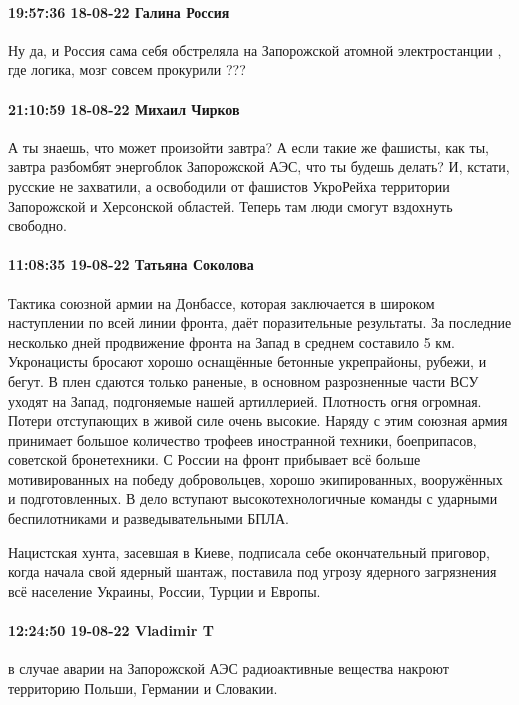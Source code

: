 \paragraph{19:57:36 18-08-22 Галина Россия}

Ну да, и Россия сама себя обстреляла на Запорожской атомной электростанции ,
где логика, мозг совсем прокурили ???

\paragraph{21:10:59 18-08-22 Михаил Чирков}

А ты знаешь, что может произойти завтра?
А если такие же фашисты, как ты, завтра разбомбят энергоблок Запорожской АЭС, что ты будешь делать?
И, кстати, русские не захватили, а освободили от фашистов УкроРейха территории Запорожской и Херсонской областей.
Теперь там люди смогут вздохнуть свободно.

\paragraph{11:08:35 19-08-22 Татьяна Соколова}

Тактика союзной армии на Донбассе, которая заключается в широком наступлении по
всей линии фронта, даёт поразительные результаты. За последние несколько дней
продвижение фронта на Запад в среднем составило 5 км. Укронацисты бросают
хорошо оснащённые бетонные укрепрайоны, рубежи, и бегут. В плен сдаются только
раненые, в основном разрозненные части ВСУ уходят на Запад, подгоняемые нашей
артиллерией. Плотность огня огромная. Потери отступающих в живой силе очень
высокие. Наряду с этим союзная армия принимает большое количество трофеев
иностранной техники, боеприпасов, советской бронетехники. С России на фронт
прибывает всё больше мотивированных на победу добровольцев, хорошо
экипированных, вооружённых и подготовленных. В дело вступают
высокотехнологичные команды с ударными беспилотниками и разведывательными БПЛА.

Нацистская хунта, засевшая в Киеве, подписала себе окончательный приговор,
когда начала свой ядерный шантаж, поставила под угрозу ядерного загрязнения всё
население Украины, России, Турции и Европы.

\paragraph{12:24:50 19-08-22 Vladimir T}

в случае аварии на Запорожской АЭС радиоактивные вещества накроют территорию
Польши, Германии и Словакии.


